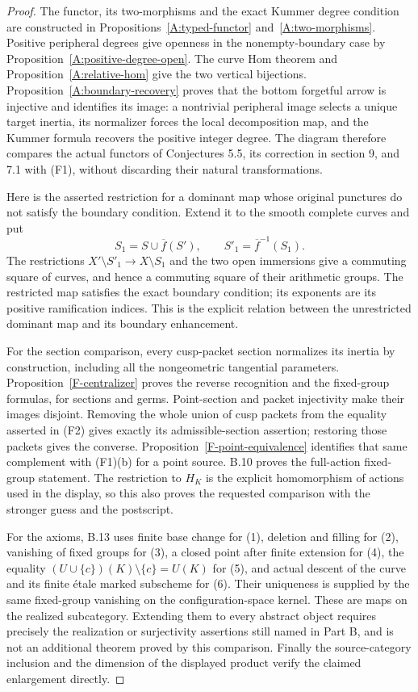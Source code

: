 \begin{proof}
The functor, its two-morphisms and the exact Kummer degree
condition are constructed in Propositions~\ref{A:typed-functor}
and~\ref{A:two-morphisms}. Positive peripheral degrees give
openness in the nonempty-boundary case by
Proposition~\ref{A:positive-degree-open}. The curve Hom theorem
and Proposition~\ref{A:relative-hom} give the two vertical
bijections. Proposition~\ref{A:boundary-recovery} proves that
the bottom forgetful arrow is injective and identifies its
image: a nontrivial peripheral image selects a unique target
inertia, its normalizer forces the local decomposition map,
and the Kummer formula recovers the positive integer degree.
The diagram therefore compares the actual functors of
Conjectures 5.5, its correction in section 9, and 7.1 with
(F1), without discarding their natural transformations.

Here is the asserted restriction for a dominant map whose
original punctures do not satisfy the boundary condition.
Extend it to the smooth complete curves and put
\[
 S_1=S\cup\overline f(S'),\qquad
 S'_1=\overline f^{-1}(S_1).
\]
The restrictions $X'\setminus S'_1\to X\setminus S_1$ and
the two open immersions give a commuting square of curves,
and hence a commuting square of their arithmetic groups.
The restricted map satisfies the exact boundary condition;
its exponents are its positive ramification indices. This is
the explicit relation between the unrestricted dominant map
and its boundary enhancement.

For the section comparison, every cusp-packet section
normalizes its inertia by construction, including all the
nongeometric tangential parameters. Proposition~\ref{F-centralizer}
proves the reverse recognition and the fixed-group formulas,
for sections and germs. Point-section and packet injectivity
make their images disjoint. Removing the whole union of cusp
packets from the equality asserted in (F2) gives exactly its
admissible-section assertion; restoring those packets gives
the converse. Proposition~\ref{F-point-equivalence} identifies
that same complement with (F1)(b) for a point source.
B.10 proves the full-action fixed-group statement. The
restriction to $H_K$ is the explicit homomorphism of actions
used in the display, so this also proves the requested
comparison with the stronger guess and the postscript.

For the axioms, B.13 uses finite base change for (1), deletion
and filling for (2), vanishing of fixed groups for (3), a
closed point after finite extension for (4), the equality
$(U\cup\{c\})(K)\setminus\{c\}=U(K)$ for (5), and
actual descent of the curve and its finite \'etale marked
subscheme for (6). Their uniqueness is supplied by the same
fixed-group vanishing on the configuration-space kernel.
These are maps on the realized subcategory. Extending them
to every abstract object requires precisely the realization
or surjectivity assertions still named in Part B, and is not
an additional theorem proved by this comparison. Finally the
source-category inclusion and the dimension of the displayed
product verify the claimed enlargement directly.
\end{proof}

